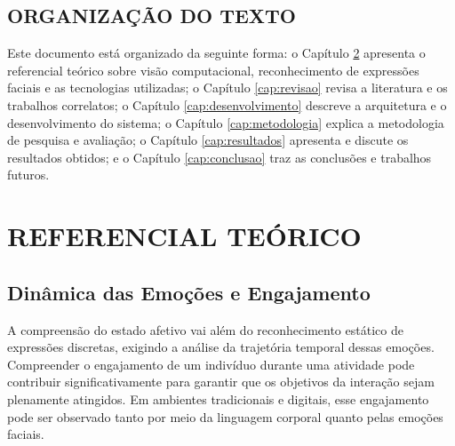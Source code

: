 \documentclass[
	12pt,
	openright,
	oneside,
	a4paper,
	english,
	brazil
	]{abntex2}
\begin{document}
\section{ORGANIZAÇÃO DO TEXTO}

Este documento está organizado da seguinte forma: o Capítulo \ref{cap:referencial} apresenta o referencial teórico sobre visão computacional, reconhecimento de expressões faciais e as tecnologias utilizadas; o Capítulo \ref{cap:revisao} revisa a literatura e os trabalhos correlatos; o Capítulo \ref{cap:desenvolvimento} descreve a arquitetura e o desenvolvimento do sistema; o Capítulo \ref{cap:metodologia} explica a metodologia de pesquisa e avaliação; o Capítulo \ref{cap:resultados} apresenta e discute os resultados obtidos; e o Capítulo \ref{cap:conclusao} traz as conclusões e trabalhos futuros.

\chapter{REFERENCIAL TEÓRICO}
\label{cap:referencial}

\section{Dinâmica das Emoções e Engajamento}

A compreensão do estado afetivo vai além do reconhecimento estático de expressões discretas, exigindo a análise da trajetória temporal dessas emoções. Compreender o engajamento de um indivíduo durante uma atividade pode contribuir significativamente para garantir que os objetivos da interação sejam plenamente atingidos. Em ambientes tradicionais e digitais, esse engajamento pode ser observado tanto por meio da linguagem corporal quanto pelas emoções faciais.
\end{document}
